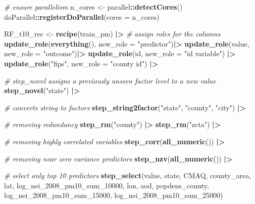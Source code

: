 \documentclass[
]{article}
\newenvironment{Shaded}{\begin{snugshade}}{\end{snugshade}}
\newcommand{\AttributeTok}[1]{\textcolor[rgb]{0.13,0.29,0.53}{#1}}
\newcommand{\CommentTok}[1]{\textcolor[rgb]{0.56,0.35,0.01}{\textit{#1}}}
\newcommand{\FunctionTok}[1]{\textcolor[rgb]{0.13,0.29,0.53}{\textbf{#1}}}
\newcommand{\NormalTok}[1]{#1}
\newcommand{\OtherTok}[1]{\textcolor[rgb]{0.56,0.35,0.01}{#1}}
\newcommand{\SpecialCharTok}[1]{\textcolor[rgb]{0.81,0.36,0.00}{\textbf{#1}}}
\newcommand{\StringTok}[1]{\textcolor[rgb]{0.31,0.60,0.02}{#1}}
\begin{document}
\begin{Shaded}
\begin{Highlighting}[]
\CommentTok{\# ensure parallelism}
\NormalTok{n\_cores }\OtherTok{\textless{}{-}}\NormalTok{ parallel}\SpecialCharTok{::}\FunctionTok{detectCores}\NormalTok{() }
\NormalTok{doParallel}\SpecialCharTok{::}\FunctionTok{registerDoParallel}\NormalTok{(}\AttributeTok{cores =}\NormalTok{ n\_cores)}

\NormalTok{RF\_t10\_rec }\OtherTok{\textless{}{-}} \FunctionTok{recipe}\NormalTok{(train\_pm) }\SpecialCharTok{|\textgreater{}}
    \CommentTok{\# assign roles for the columns}
    \FunctionTok{update\_role}\NormalTok{(}\FunctionTok{everything}\NormalTok{(), }\AttributeTok{new\_role =} \StringTok{"predictor"}\NormalTok{)}\SpecialCharTok{|\textgreater{}}
    \FunctionTok{update\_role}\NormalTok{(value, }\AttributeTok{new\_role =} \StringTok{"outcome"}\NormalTok{)}\SpecialCharTok{|\textgreater{}}
    \FunctionTok{update\_role}\NormalTok{(id, }\AttributeTok{new\_role =} \StringTok{"id variable"}\NormalTok{) }\SpecialCharTok{|\textgreater{}}
    \FunctionTok{update\_role}\NormalTok{(}\StringTok{"fips"}\NormalTok{, }\AttributeTok{new\_role =} \StringTok{"county id"}\NormalTok{) }\SpecialCharTok{|\textgreater{}}
  
    \CommentTok{\# step\_novel assigns a previously unseen factor level to a new value }
    \FunctionTok{step\_novel}\NormalTok{(}\StringTok{"state"}\NormalTok{) }\SpecialCharTok{|\textgreater{}}
  
    \CommentTok{\# converts string to factors}
    \FunctionTok{step\_string2factor}\NormalTok{(}\StringTok{"state"}\NormalTok{, }\StringTok{"county"}\NormalTok{, }\StringTok{"city"}\NormalTok{) }\SpecialCharTok{|\textgreater{}}

    \CommentTok{\# removing redundancy}
    \FunctionTok{step\_rm}\NormalTok{(}\StringTok{"county"}\NormalTok{) }\SpecialCharTok{|\textgreater{}}
    \FunctionTok{step\_rm}\NormalTok{(}\StringTok{"zcta"}\NormalTok{) }\SpecialCharTok{|\textgreater{}}
  
    \CommentTok{\# removing highly correlated variables}
    \FunctionTok{step\_corr}\NormalTok{(}\FunctionTok{all\_numeric}\NormalTok{()) }\SpecialCharTok{|\textgreater{}}
    
    \CommentTok{\# removing near zero variance predictors}
    \FunctionTok{step\_nzv}\NormalTok{(}\FunctionTok{all\_numeric}\NormalTok{()) }\SpecialCharTok{|\textgreater{}}

    \CommentTok{\# select only top 10 predictors}
    \FunctionTok{step\_select}\NormalTok{(value, state, CMAQ, county\_area, lat, log\_nei\_2008\_pm10\_sum\_10000,}
\NormalTok{                lon, aod, popdens\_county, log\_nei\_2008\_pm10\_sum\_15000,}
\NormalTok{                log\_nei\_2008\_pm10\_sum\_25000)}
    

\end{Highlighting}
\end{Shaded}
\end{document}

